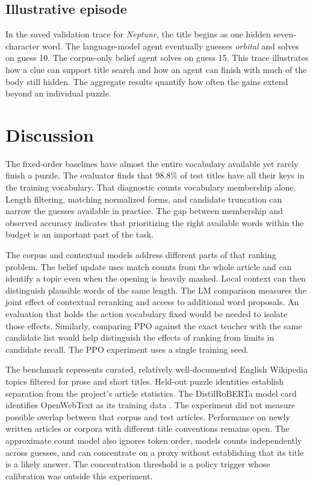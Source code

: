 \documentclass[conference]{IEEEtran}
\begin{document}
\subsection{Illustrative episode}
In the saved validation trace for \emph{Neptune}, the title begins as one hidden seven-character word. The language-model agent eventually guesses \emph{orbital} and solves on guess 10. The corpus-only belief agent solves on guess 15. This trace illustrates how a clue can support title search and how an agent can finish with much of the body still hidden. The aggregate results quantify how often the gains extend beyond an individual puzzle.

\section{Discussion}
The fixed-order baselines have almost the entire vocabulary available yet rarely finish a puzzle. The evaluator finds that 98.8\% of test titles have all their keys in the training vocabulary. That diagnostic counts vocabulary membership alone. Length filtering, matching normalized forms, and candidate truncation can narrow the guesses available in practice. The gap between membership and observed accuracy indicates that prioritizing the right available words within the budget is an important part of the task.

The corpus and contextual models address different parts of that ranking problem. The belief update uses match counts from the whole article and can identify a topic even when the opening is heavily masked. Local context can then distinguish plausible words of the same length. The LM comparison measures the joint effect of contextual reranking and access to additional word proposals. An evaluation that holds the action vocabulary fixed would be needed to isolate those effects. Similarly, comparing PPO against the exact teacher with the same candidate list would help distinguish the effects of ranking from limits in candidate recall. The PPO experiment uses a single training seed.

The benchmark represents curated, relatively well-documented English Wikipedia topics filtered for prose and short titles. Held-out puzzle identities establish separation from the project's article statistics. The DistilRoBERTa model card identifies OpenWebText as its training data \cite{distil}. The experiment did not measure possible overlap between that corpus and test articles. Performance on newly written articles or corpora with different title conventions remains open. The approximate count model also ignores token order, models counts independently across guesses, and can concentrate on a proxy without establishing that its title is a likely answer. The concentration threshold is a policy trigger whose calibration was outside this experiment.
\end{document}
